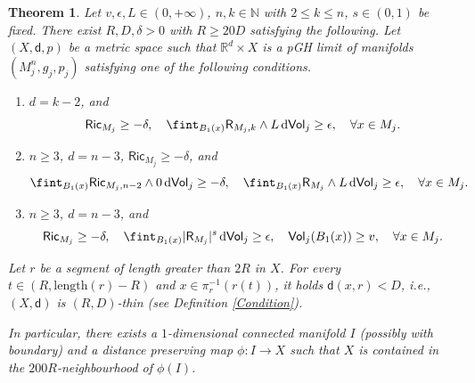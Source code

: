 \documentclass[10pt]{article}
\newtheorem{thm}{Theorem}[section]
\theoremstyle{definition}
\newcommand{\bb}[1]{\mathbb{#1}}
\newcommand{\ssf}[1]{\mathsf{#1}}
\newcommand{\sd}{\mathsf{d}}
\newcommand{\R}{\mathsf{R}}
\newcommand{\de}{{\rm d}}
\begin{document}
\begin{thm} \label{thmSNPGeneral}
    Let $v,\epsilon,L \in (0,+\infty)$, $n,k \in \bb{N}$ with $2 \leq k \leq n$, $s \in (0,1)$ be fixed. There exist $R,D,\delta>0$ with $R \geq 20D$ satisfying the following. Let $(X,\sd,p)$ be a metric space such that $\bb{R}^d \times X$ is a pGH limit of manifolds $(M^n_j,g_j,p_j)$ satisfying one of the following conditions.
    \begin{enumerate}
        \item  $d=k-2$, and
    \begin{equation} \label{Condition1General}
    \ssf{Ric}_{M_j} \geq -\delta, \quad
     \fint_{B_1(x)} \R_{M_j,k} \wedge L \,\de\ssf{Vol}_j  \geq \epsilon, \quad \forall x \in M_j.
    \end{equation}
    \item $n \geq 3$, $d=n-3$, $\ssf{Ric}_{M_j} \geq -\delta$, and
    \begin{equation} \label{condition2General}
    \fint_{B_1(x)} \ssf{Ric}_{M_j,n-2} \wedge 0 \, \de \ssf{Vol}_j  \geq -\delta, \quad  \fint_{B_1(x)} \R_{M_j} \wedge L \,\de\ssf{Vol}_j  \geq \epsilon, \quad \forall x \in M_j.
    \end{equation}
    \item $n \geq 3$, $d=n-3$, and
    \begin{equation} \label{condition3General}
    \ssf{Ric}_{M_j} \geq -\delta, \quad  \fint_{B_1(x)} |\R_{M_j}|^s \,\de\ssf{Vol}_j  \geq \epsilon, \quad \ssf{Vol}_j(B_1(x)) \geq v, \quad \forall x \in M_j.
    \end{equation}
    \end{enumerate}
    Let $r$ be a segment of length greater than $2R$ in $X$. For every $t \in (R,\mathrm{length}(r)-R)$ and $x \in \pi_r^{-1}(r(t))$, it holds $\sd(x,r) < D$, i.e., $(X,\sd)$ is $(R,D)$-thin (see Definition \ref{Condition}).

    In particular, there exists a $1$-dimensional connected manifold $I$ (possibly with boundary) and a distance preserving map $\phi:I \to X$ such that $X$ is contained in the $200R$-neighbourhood of $\phi(I)$.
    \end{thm}
    
\end{document}
